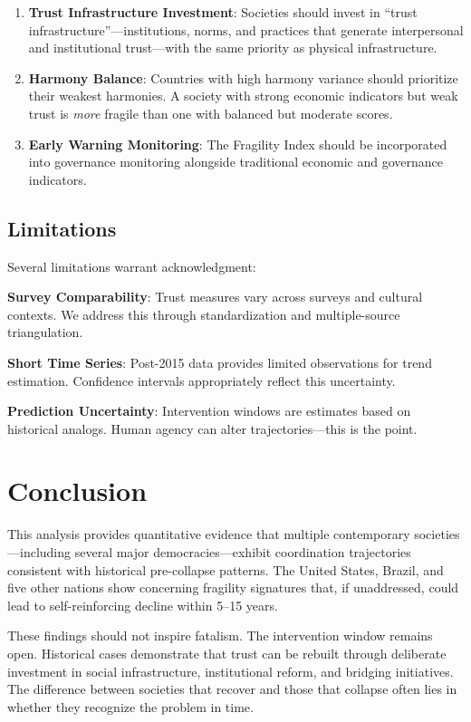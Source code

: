 \documentclass[11pt,a4paper]{article}
\begin{document}
\begin{enumerate}
\item \textbf{Trust Infrastructure Investment}: Societies should invest in ``trust infrastructure''---institutions, norms, and practices that generate interpersonal and institutional trust---with the same priority as physical infrastructure.

\item \textbf{Harmony Balance}: Countries with high harmony variance should prioritize their weakest harmonies. A society with strong economic indicators but weak trust is \textit{more} fragile than one with balanced but moderate scores.

\item \textbf{Early Warning Monitoring}: The Fragility Index should be incorporated into governance monitoring alongside traditional economic and governance indicators.
\end{enumerate}

\subsection{Limitations}

Several limitations warrant acknowledgment:

\textbf{Survey Comparability}: Trust measures vary across surveys and cultural contexts. We address this through standardization and multiple-source triangulation.

\textbf{Short Time Series}: Post-2015 data provides limited observations for trend estimation. Confidence intervals appropriately reflect this uncertainty.

\textbf{Prediction Uncertainty}: Intervention windows are estimates based on historical analogs. Human agency can alter trajectories---this is the point.

\section{Conclusion}

This analysis provides quantitative evidence that multiple contemporary societies---including several major democracies---exhibit coordination trajectories consistent with historical pre-collapse patterns. The United States, Brazil, and five other nations show concerning fragility signatures that, if unaddressed, could lead to self-reinforcing decline within 5--15 years.

These findings should not inspire fatalism. The intervention window remains open. Historical cases demonstrate that trust can be rebuilt through deliberate investment in social infrastructure, institutional reform, and bridging initiatives. The difference between societies that recover and those that collapse often lies in whether they recognize the problem in time.
\end{document}
